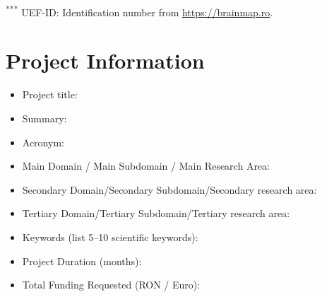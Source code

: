 \documentclass[draftproposal,pncdia]{pncdi-pd}
\begin{document}
{\footnotesize
\noindent \textsuperscript{***} UEF-ID: Identification number from \url{https://brainmap.ro}.
}

\section{Project Information}

\begin{itemize}[leftmargin=*, noitemsep]
\item
Project title:

\item
Summary:

\item
Acronym:

\item
Main Domain / Main Subdomain / Main Research Area:

\item
Secondary Domain/Secondary Subdomain/Secondary research area:

\item
Tertiary Domain/Tertiary Subdomain/Tertiary research area:

\item
Keywords (list 5--10 scientific keywords):

\item
Project Duration (months):

\item
Total Funding Requested (RON / Euro):
\end{itemize}
\end{document}
